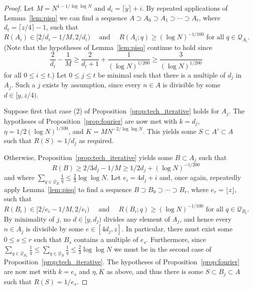\begin{proof}
Let $M=N^{1-1/\log\log N}$ and $d_i = \lceil y \rceil +i$. By repeated applications of Lemma~\ref{lem:pisq} we can find a sequence $A\supset A_0\supset A_1\supset\cdots \supset A_{t}$, where $d_t=\lceil z/4\rceil-1$, such that
\[R(A_i)\in [2/d_i-1/M,2/d_i)\quad\textrm{ and }\quad R(A_i;q)\geq (\log N)^{-1/100}\textrm{ for all }q\in \mathcal{Q}_{A_i}.\]
(Note that the hypotheses of Lemma~\ref{lem:pisq} continue to hold since
\[\frac{2}{d_i}-\frac{1}{M}\geq \frac{2}{d_{i}+1}+\frac{1}{(\log N)^{1/200}}\geq \frac{3}{(\log N)^{1/200}}\]
for all $0\leq i\leq t$.) Let $0\leq j\leq t$ be minimal such that there is a multiple of $d_j$ in $A_j$. Such a $j$ exists by assumption, since every $n\in A$ is divisible by some $d\in[y,z/4)$.

Suppose first that case (2) of Proposition~\ref{prop:tech_iterative} holds for $A_j$. The hypotheses of Proposition~\ref{prop:fourier} are now met with $k=d_j$, $\eta=1/2(\log N)^{1/100}$, and $K=MN^{-2/\log \log N}$. This yields some $S\subset A'\subset A$ such that $R(S)=1/d_j$ as required.

Otherwise, Proposition~\ref{prop:tech_iterative} yields some $B\subset A_j$ such that
\[R(B)\geq 2/3d_j-1/M\geq 1/2d_j+(\log N)^{-1/200}\]
and where $\sum_{q\in\mathcal{Q}_B}\frac{1}{q}\leq \frac{2}{3}\log\log N$. Let $e_i = 4d_j+i$ and, once again, repeatedly apply Lemma~\ref{lem:pisq} to find a sequence $B\supset B_0\supset \cdots\supset B_r$, where $e_r=\lfloor z\rfloor$, such that
\[R(B_i)\in [2/e_i-1/M,2/e_i)\quad\textrm{ and }\quad R(B_i;q)\geq (\log N)^{-1/100}\textrm{ for all }q\in \mathcal{Q}_{B_i}.\]
By minimality of $j$, no $d\in [y,d_j)$ divides any element of $A_j$, and hence every $n\in A_j$ is divisible by some $e\in [4d_j,z]$. In particular, there must exist some $0\leq s\leq r$ such that $B_s$ contains a multiple of $e_s$. Furthermore, since $\sum_{q\in \mathcal{Q}_{B_s}}\frac{1}{q}\leq \sum_{q\in\mathcal{Q}_B}\frac{1}{q}\leq \frac{2}{3}\log\log N$ we must be in the second case of Proposition~\ref{prop:tech_iterative}. The hypotheses of Proposition~\ref{prop:fourier} are now met with $k=e_s$ and $\eta,K$ as above, and thus there is some $S\subset B_j\subset A$ such that $R(S)=1/e_s$.
\end{proof}












